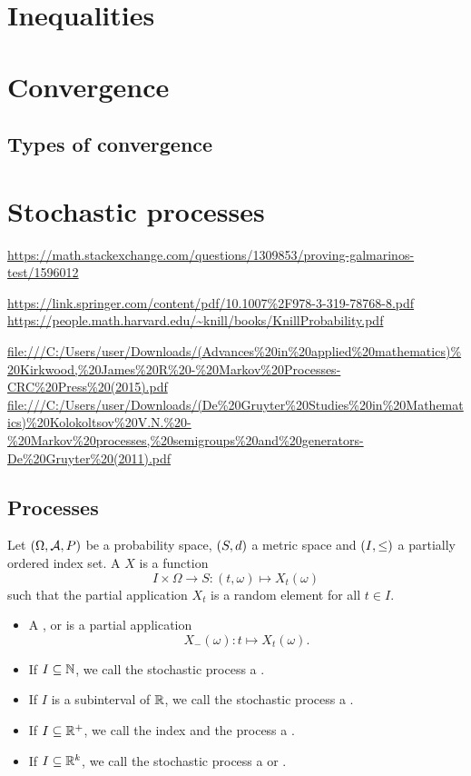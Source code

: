 \chapter{Inequalities}

\chapter{Convergence}
\section{Types of convergence}

\chapter{Stochastic processes}
\url{https://math.stackexchange.com/questions/1309853/proving-galmarinos-test/1596012}

\url{https://link.springer.com/content/pdf/10.1007%2F978-3-319-78768-8.pdf}
\url{https://people.math.harvard.edu/~knill/books/KnillProbability.pdf}

\url{file:///C:/Users/user/Downloads/(Advances%20in%20applied%20mathematics)%20Kirkwood,%20James%20R%20-%20Markov%20Processes-CRC%20Press%20(2015).pdf}
\url{file:///C:/Users/user/Downloads/(De%20Gruyter%20Studies%20in%20Mathematics)%20Kolokoltsov%20V.N.%20-%20Markov%20processes,%20semigroups%20and%20generators-De%20Gruyter%20(2011).pdf}

\section{Processes}
\begin{definition}
Let $\left( \Omega, \mathcal{A}, P \right)$ be a probability space, $\left( S,d \right)$ a metric space and $\left( I,\leq \right)$ a partially ordered index set. A  $X$ is a function
\[ I\times \Omega \to S: (t,\omega) \mapsto X_t(\omega) \]
such that the partial application $X_t$ is a random element for all $t\in I$.
\begin{itemize}
\item A ,  or  is a partial application
\[ X_-(\omega): t\mapsto X_t(\omega). \]
\item If $I \subseteq \mathbb{N}$, we call the stochastic process a .
\item If $I$ is a subinterval of $\mathbb{R}$, we call the stochastic process a .
\item If $I\subseteq \mathbb{R}^+$, we call the index  and the process a .
\item If $I\subseteq \mathbb{R}^k$, we call the stochastic process a  or .
\end{itemize}
\end{definition}

